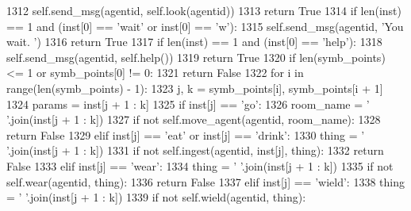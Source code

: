 \begin{DoxyCode}
1312             self.send\_msg(agentid, self.look(agentid))
1313             \textcolor{keywordflow}{return} \textcolor{keyword}{True}
1314         \textcolor{keywordflow}{if} len(inst) == 1 \textcolor{keywordflow}{and} (inst[0] == \textcolor{stringliteral}{'wait'} \textcolor{keywordflow}{or} inst[0] == \textcolor{stringliteral}{'w'}):
1315             self.send\_msg(agentid, \textcolor{stringliteral}{'You wait. '})
1316             \textcolor{keywordflow}{return} \textcolor{keyword}{True}
1317         \textcolor{keywordflow}{if} len(inst) == 1 \textcolor{keywordflow}{and} (inst[0] == \textcolor{stringliteral}{'help'}):
1318             self.send\_msg(agentid, self.help())
1319             \textcolor{keywordflow}{return} \textcolor{keyword}{True}
1320         \textcolor{keywordflow}{if} len(symb\_points) <= 1 \textcolor{keywordflow}{or} symb\_points[0] != 0:
1321             \textcolor{keywordflow}{return} \textcolor{keyword}{False}
1322         \textcolor{keywordflow}{for} i \textcolor{keywordflow}{in} range(len(symb\_points) - 1):
1323             j, k = symb\_points[i], symb\_points[i + 1]
1324             params = inst[j + 1 : k]
1325             \textcolor{keywordflow}{if} inst[j] == \textcolor{stringliteral}{'go'}:
1326                 room\_name = \textcolor{stringliteral}{' '}.join(inst[j + 1 : k])
1327                 \textcolor{keywordflow}{if} \textcolor{keywordflow}{not} self.move\_agent(agentid, room\_name):
1328                     \textcolor{keywordflow}{return} \textcolor{keyword}{False}
1329             \textcolor{keywordflow}{elif} inst[j] == \textcolor{stringliteral}{'eat'} \textcolor{keywordflow}{or} inst[j] == \textcolor{stringliteral}{'drink'}:
1330                 thing = \textcolor{stringliteral}{' '}.join(inst[j + 1 : k])
1331                 \textcolor{keywordflow}{if} \textcolor{keywordflow}{not} self.ingest(agentid, inst[j], thing):
1332                     \textcolor{keywordflow}{return} \textcolor{keyword}{False}
1333             \textcolor{keywordflow}{elif} inst[j] == \textcolor{stringliteral}{'wear'}:
1334                 thing = \textcolor{stringliteral}{' '}.join(inst[j + 1 : k])
1335                 \textcolor{keywordflow}{if} \textcolor{keywordflow}{not} self.wear(agentid, thing):
1336                     \textcolor{keywordflow}{return} \textcolor{keyword}{False}
1337             \textcolor{keywordflow}{elif} inst[j] == \textcolor{stringliteral}{'wield'}:
1338                 thing = \textcolor{stringliteral}{' '}.join(inst[j + 1 : k])
1339                 \textcolor{keywordflow}{if} \textcolor{keywordflow}{not} self.wield(agentid, thing):

\end{DoxyCode}
